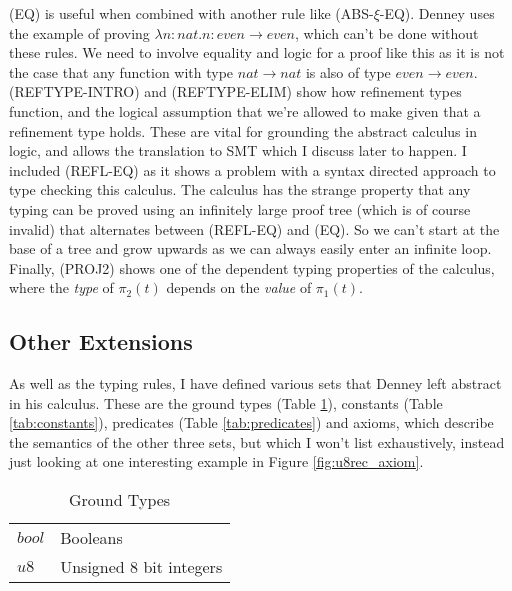 (EQ) is useful when combined with another rule like (ABS-$\xi$-EQ).
Denney uses the example of proving $\lambda n: nat.n : even \rightarrow even$, which can't be done
without these rules.
We need to involve equality and logic for a proof like this as it is not the case that any function
with type $nat \rightarrow nat$ is also of type $even \rightarrow even$.
(REFTYPE-INTRO) and (REFTYPE-ELIM) show how refinement types function, and the logical assumption
that we're allowed to make given that a refinement type holds.
These are vital for grounding the abstract calculus in logic, and allows the translation to SMT
which I discuss later to happen.
I included (REFL-EQ) as it shows a problem with a syntax directed approach to type checking this
calculus.
The calculus has the strange property that any typing can be proved using an infinitely large
proof tree (which is of course invalid) that alternates between (REFL-EQ) and (EQ).
So we can't start at the base of a tree and grow upwards as we can always easily enter an infinite
loop.
Finally, (PROJ2) shows one of the dependent typing properties of the calculus, where the \textit{type}
of $\pi_2(t)$ depends on the \textit{value} of $\pi_1(t)$.

\subsection{Other Extensions}

As well as the typing rules, I have defined various sets that Denney left abstract in his calculus.
These are the ground types (Table \ref{tab:ground_types}), constants (Table \ref{tab:constants}),
predicates (Table \ref{tab:predicates}) and axioms, which describe the semantics of the other three
sets, but which I won't list exhaustively, instead just looking at one interesting example in
Figure \ref{fig:u8rec_axiom}.

\begin{table}
    \centering
    \begin{tabular}{|l|l|}
        \cline{1-2}
        $bool$ & Booleans\\\cline{1-2}
        $u8$ & Unsigned 8 bit integers\\\cline{1-2}
    \end{tabular}
    \caption{Ground Types}
    \label{tab:ground_types}
\end{table}

